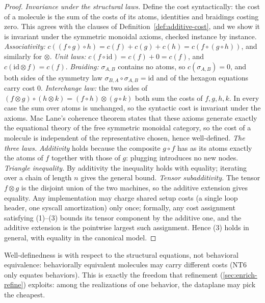 \begin{proof}
\emph{Invariance under the structural laws.} Define the cost syntactically: the
cost of a molecule is the sum of the costs of its atoms, identities and
braidings costing zero. This agrees with the clauses of
Definition~\ref{def:additive-cost}, and we show it is invariant under the
symmetric monoidal axioms, checked instance by instance. \emph{Associativity:}
$c((f \circ g) \circ h) = c(f) + c(g) + c(h) = c(f \circ (g \circ h))$, and
similarly for $\otimes$. \emph{Unit laws:} $c(f \circ \mathrm{id}) = c(f) +
0 = c(f)$, and $c(\mathrm{id} \otimes f) = c(f)$. \emph{Braiding:}
$\sigma_{A,B}$ contains no atoms, so $c(\sigma_{A,B}) = 0$, and both sides of
the symmetry law $\sigma_{B,A} \circ \sigma_{A,B} = \mathrm{id}$ and of the
hexagon equations carry cost $0$. \emph{Interchange law:} the two sides of
$(f \otimes g) \circ (h \otimes k) = (f \circ h) \otimes (g \circ k)$ both sum
the costs of $f, g, h, k$. In every case the sum over atoms is unchanged, so
the syntactic cost is invariant under the axioms. Mac Lane's coherence theorem
\cite{maclane} states that these axioms generate exactly the equational theory
of the free symmetric monoidal category, so the cost of a molecule is
independent of the representative chosen, hence well-defined.
\emph{The three laws.} \emph{Additivity} holds because the composite
$g \circ f$ has as its atoms exactly the atoms of $f$ together with those of
$g$: plugging introduces no new nodes. \emph{Triangle inequality.} By
additivity the inequality holds with equality; iterating over a chain of
length $n$ gives the general bound. \emph{Tensor subadditivity.} The tensor
$f \otimes g$ is the disjoint union of the two machines, so the additive
extension gives equality. Any implementation may charge shared setup costs (a
single loop header, one syscall amortization) only once; formally, any cost
assignment satisfying (1)--(3) bounds its tensor component by the additive
one, and the additive extension is the pointwise largest such assignment.
Hence (3) holds in general, with equality in the canonical model.
\end{proof}

\begin{remark}
Well-definedness is with respect to the structural equations, not behavioral
equivalence: behaviorally equivalent molecules may carry different costs (NT6
only equates behaviors). This is exactly the freedom that refinement
(\autoref{sec:enrich-refine}) exploits: among the realizations of one
behavior, the dataplane may pick the cheapest.
\end{remark}

